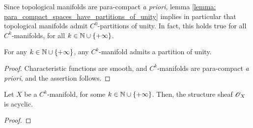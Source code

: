         Since topological manifolds are para-compact \textit{a priori}, lemma \ref{lemma: para_compact_spaces_have_partitions_of_unity} implies in particular that topological manifolds admit $C^0$-partitions of unity. In fact, this holds true for all $C^k$-manifolds, for all $k \in \mathbb{N} \cup \{+\infty\}$.
        \begin{proposition} \label{prop: existence_of_partitions_of_unity}
            For any $k \in \mathbb{N} \cup \{+\infty\}$, any $C^k$-manifold admits a partition of unity.
        \end{proposition}
            \begin{proof}
                Characteristic functions are smooth, and $C^k$-manifolds are para-compact \textit{a priori}, and the assertion follows.
            \end{proof}
    
        \begin{theorem}
            Let $X$ be a $C^k$-manifold, for some $k \in \mathbb{N} \cup \{+\infty\}$. Then, the structure sheaf $\mathscr{O}_X$ is acyclic.
        \end{theorem}
            \begin{proof}
                
            \end{proof}
        \begin{corollary}
            
        \end{corollary}

        \begin{definition} \label{def: coherent_modules}
            
        \end{definition}

